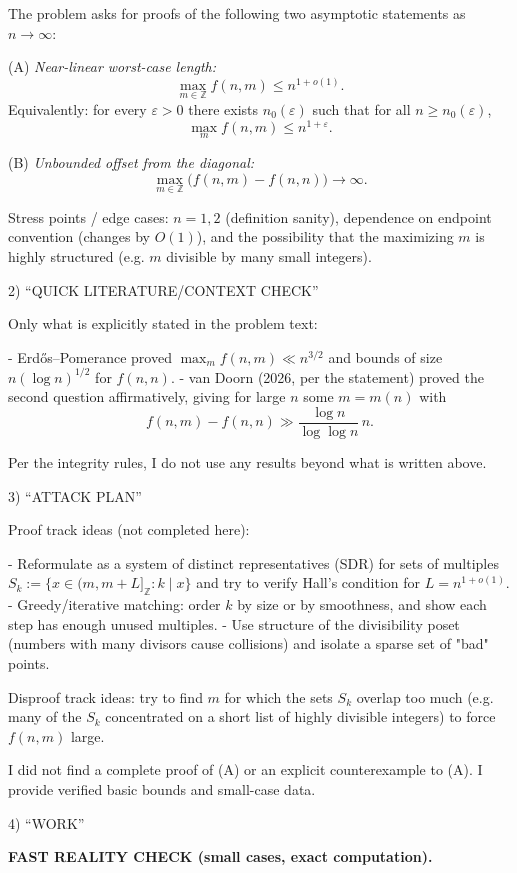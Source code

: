 The problem asks for proofs of the following two asymptotic statements as $n\to\infty$:

(A) \emph{Near-linear worst-case length:}
\[
\max_{m\in\mathbb Z} f(n,m) \le n^{1+o(1)}.
\]
Equivalently: for every $\varepsilon>0$ there exists $n_0(\varepsilon)$ such that for all $n\ge n_0(\varepsilon)$,
\[
\max_m f(n,m) \le n^{1+\varepsilon}.
\]

(B) \emph{Unbounded offset from the diagonal:}
\[
\max_{m\in\mathbb Z}\bigl(f(n,m)-f(n,n)\bigr)\to\infty.
\]

Stress points / edge cases: $n=1,2$ (definition sanity), dependence on endpoint convention (changes by $O(1)$), and the possibility that the maximizing $m$ is highly structured (e.g. $m$ divisible by many small integers).

2) “QUICK LITERATURE/CONTEXT CHECK”

Only what is explicitly stated in the problem text:

- Erd\H{o}s--Pomerance proved $\max_m f(n,m)\ll n^{3/2}$ and bounds of size $n(\log n)^{1/2}$ for $f(n,n)$.
- van Doorn (2026, per the statement) proved the second question affirmatively, giving for large $n$ some $m=m(n)$ with
\[
 f(n,m)-f(n,n) \gg \frac{\log n}{\log\log n}\,n.
\]

Per the integrity rules, I do not use any results beyond what is written above.

3) “ATTACK PLAN”

Proof track ideas (not completed here):

- Reformulate as a system of distinct representatives (SDR) for sets of multiples $S_k := \{x\in(m,m+L]_{\mathbb Z}: k\mid x\}$ and try to verify Hall's condition for $L=n^{1+o(1)}$.
- Greedy/iterative matching: order $k$ by size or by smoothness, and show each step has enough unused multiples.
- Use structure of the divisibility poset (numbers with many divisors cause collisions) and isolate a sparse set of "bad" points.

Disproof track ideas: try to find $m$ for which the sets $S_k$ overlap too much (e.g. many of the $S_k$ concentrated on a short list of highly divisible integers) to force $f(n,m)$ large.

I did not find a complete proof of (A) or an explicit counterexample to (A). I provide verified basic bounds and small-case data.

4) “WORK”

\textbf{FAST REALITY CHECK (small cases, exact computation).}

